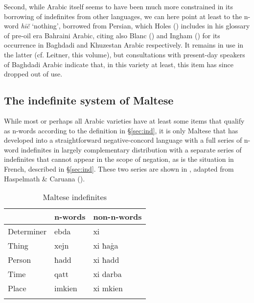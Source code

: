 \documentclass[output=paper]{langsci/langscibook}
\begin{document}
Second, while Arabic itself seems to have been much more constrained in its borrowing of indefinites from other languages, we can here point at least to the n-word \textit{hīč} ‘nothing’, borrowed from Persian, which Holes (\citeyear[549]{Holes2001}) includes in his glossary of pre-oil era Bahraini Arabic, citing also Blanc (\citeyear[159]{Blanc1964}) and Ingham (\citeyear[547]{Ingham1973}) for its occurrence in Baghdadi and Khuzestan Arabic respectively. It remains in use in the latter (cf. Leitner, this volume), but consultations with present-day speakers of Baghdadi Arabic indicate that, in this variety at least, this item has since dropped out of use.



\subsection{The indefinite system of Maltese}


While most or perhaps all Arabic varieties have at least some items that qualify as n-words according to the definition in §\ref{sec:ind}, it is only Maltese that has developed into a straightforward negative-concord language with a full series of n-word indefinites in largely complementary distribution with a separate series of indefinites that cannot appear in the scope of negation, as is the situation in French, described in §\ref{sec:ind}. These two series are shown in , adapted from Haspelmath \& Caruana (\citeyear[215]{HaspelmathCaruana1996}).

\begin{table}
\begin{tabularx}{.6\textwidth}{XXX} 
\lsptoprule
& n-words & non-n-words\\
\midrule
Determiner & ebda & xi\\
Thing & xejn & xi ħa\.ga\\
Person & ħadd & xi ħadd\\
Time & qatt & xi darba\\
Place & imkien & xi mkien\\
\lspbottomrule
\end{tabularx}
\caption{Maltese indefinites}
\label{tab:negation:malteseindefinites}
\end{table}
\end{document}
